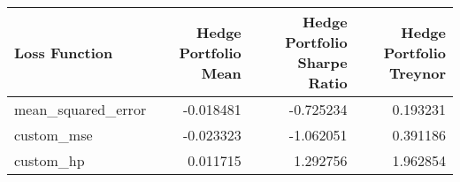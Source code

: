 \begin{tabular}{lrrr}
\toprule
     Loss Function &  Hedge Portfolio Mean &  Hedge Portfolio Sharpe Ratio &  Hedge Portfolio Treynor \\
\midrule
mean\_squared\_error &             -0.018481 &                     -0.725234 &                 0.193231 \\
        custom\_mse &             -0.023323 &                     -1.062051 &                 0.391186 \\
         custom\_hp &              0.011715 &                      1.292756 &                 1.962854 \\
\bottomrule
\end{tabular}

